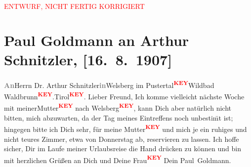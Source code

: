 
\begin{center}
            \textcolor{red}{ENTWURF, NICHT FERTIG KORRIGIERT}
                      \end{center}
            
         \renewcommand{\erwaehnteOrte}{Orte: Berlin, Wien}
         \renewcommand{\erwaehnteWerke}{}
               \section[Paul Goldmann an Arthur Schnitzler, {[}16. 8. 1907{]}]{ Paul Goldmann an Arthur Schnitzler, {[}16. 8. 1907{]}}\nopagebreak{}\rehead{ }\begin{ledgroupsized}[t]{13cm}\normalsize\beginnumbering \toendnotes[C]{\smallbreak\pagebreak[2]} 
\toendnotes[C]{\smallbreak}\pstart
           \noindent{}{\pb}\pstart{}\textcolor{gray}{\textbf{ An}}\pend{}\pstart{}Herrn Dr. Arthur Schnitzler\pend{}\pstart{}\textcolor{gray}{\textbf{in}}Welsberg im Pustertal\textcolor{red}{\textsuperscript{\textbf{KEY}}}\pend{}\pstart{}Wildbad Waldbrunn\textcolor{red}{\textsuperscript{\textbf{KEY}}}.\pend{}\pstart{}Tirol\textcolor{red}{\textsuperscript{\textbf{KEY}}}.\pend{}{\pb}\pend
           \pstart
           Lieber Freund, Ich komme vielleicht nächste Woche mit meinerMutter\textcolor{red}{\textsuperscript{\textbf{KEY}}} nach Welsberg\textcolor{red}{\textsuperscript{\textbf{KEY}}}, kann
               Dich aber natürlich nicht bitten, mich abzuwarten, da der Tag meines Eintreffens noch
               unbestim̄t ist; hingegen bitte ich Dich sehr, für meine Mutter\textcolor{red}{\textsuperscript{\textbf{KEY}}} und mich\strikeout{,} je ein ruhiges und nicht
                  teu\label{XXXXv}\label{XXXX}res Zimmer, etwa von Donnerstag
               ab, reservieren zu lassen. Ich hoffe sicher, Dir im Laufe meiner Urlaubsreise die
               Hand drücken zu können und bin mit herzlichen Grüßen an Dich und Deine Frau\textcolor{red}{\textsuperscript{\textbf{KEY}}} Dein \spacefill\mbox{Paul Goldmann. }\pend
           
         
         \endnumbering{}\end{ledgroupsized}\begin{anhang}\end{anhang}\newcommand{\dateiname}{L03256}\newcommand{\titel}{Paul Goldmann an Arthur Schnitzler, [16. 8. 1907]}\newcommand{\editorInnen}{Martin Anton Müller und Laura Untner}
      